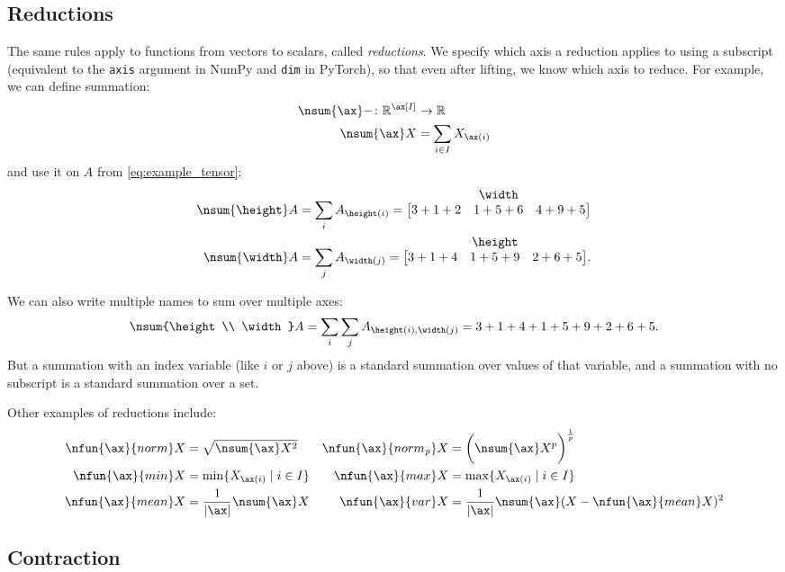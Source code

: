 \subsection{Reductions}
\label{sec:reductions}

The same rules apply to functions from vectors to scalars, called \emph{reductions}. We specify which axis a reduction applies to using a subscript (equivalent to the \verb|axis| argument in NumPy and \verb|dim| in PyTorch), so that even after lifting, we know which axis to reduce.
%
For example, we can define summation:
\begin{align*}
\nsum{\ax} \mathord- \colon \reals^{\ax[I]} &\rightarrow \reals \\
\nsum{\ax} X &= \sum_{i \in I} X_{\ax(i)}
\end{align*}
and use it on $A$ from \cref{eq:example_tensor}:
\begin{align*}
\nsum{\height} A &= \sum_i A_{\height(i)} = \nmatrix{}{\width}{
  3+1+2 & 1+5+6 & 4+9+5
}
\\
\nsum{\width} A &= \sum_j A_{\width(j)} = \nmatrix{}{\height}{
  3+1+4 & 1+5+9 & 2+6+5
}.
\end{align*}

We can also write multiple names to sum over multiple axes:
\begin{equation*}
  \nsum{\height \\ \width} A = \sum_i \sum_j A_{\height(i),\width(j)} = 3+1+4+1+5+9+2+6+5.
\end{equation*}
But a summation with an index variable (like $i$ or $j$ above) is a standard summation over values of that variable, and a summation with no subscript is a standard summation over a set.

Other examples of reductions include:
\begin{align*}
  \nfun{\ax}{norm} X &= \sqrt{\nsum{\ax} X^2} & \nfun{\ax}{norm_\mathit{p}} X &= \biggl(\nsum{\ax} X^p\biggr)^{\frac1p} \\
  \nfun{\ax}{min} X &= \min \{X_{\ax(i)} \mid i \in I\} &
  \nfun{\ax}{max} X &= \max \{X_{\ax(i)} \mid i \in I\} \\
  \nfun{\ax}{mean} X &= \frac{1}{|\ax|} \nsum{\ax} X &
  \nfun{\ax}{var} X &= \frac{1}{|\ax|} \nsum{\ax} (X - \nfun{\ax}{mean} X)^2
\end{align*}

\subsection{Contraction}

